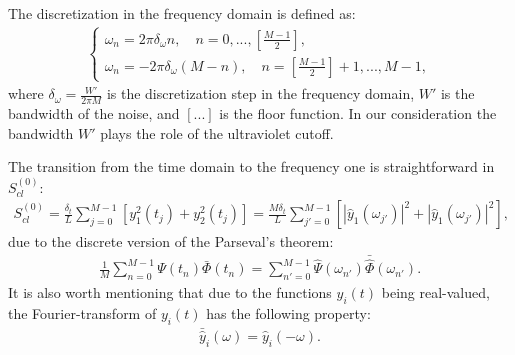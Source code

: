 \documentclass{article}
\begin{document}
The discretization in the frequency domain is defined as: 
\begin{eqnarray}\label{Bfreqs}
    \begin{cases}
    \omega_{n} = 2\pi \delta_{\omega} n,\quad n = 0, ..., \left[\frac{M-1}{2}\right],\\
    \omega_{n} = -2\pi \delta_{\omega} (M - n),\quad n = \left[\frac{M-1}{2}\right] + 1, ..., M-1,
    \end{cases}
\end{eqnarray}
where $\delta_\omega = \frac{W'}{2\pi M}$ is the discretization step in the frequency domain, $W'$ is the bandwidth of the noise, and $[...]$ is the floor function. In our consideration the bandwidth $W'$ plays the role of the ultraviolet cutoff. 

The transition from the time domain to the frequency one is straightforward in $S_{cl}^{(0)}$:
\begin{eqnarray}
    \!\!\!S_{cl}^{(0)} = \frac{\delta_{t}}{L}\sum_{j=0}^{M-1} \left[y_{1}^{2}(t_{j}) + y_{2}^{2}(t_{j})\right] = \frac{M\delta_{t}}{L} \sum_{j'=0}^{M-1} \left[|\hat{y}_{1}(\omega_{j'})|^{2} + |\hat{y}_{1}(\omega_{j'})|^{2}\right],
\end{eqnarray}
due to the discrete version of the Parseval's theorem:
\begin{eqnarray}
    \frac{1}{M} \sum_{n=0}^{M-1} \Psi(t_{n}) \bar{\Phi}(t_{n}) = \sum_{n'=0}^{M-1} \hat{\Psi}(\omega_{n'}) \bar{\hat{\Phi}}(\omega_{n'}).
\end{eqnarray}
It is also worth mentioning that due to the functions $y_{i}(t)$ being real-valued, the Fourier-transform of $y_{i}(t)$ has the following property:
\begin{eqnarray}
    \bar{\hat{y}}_{i}(\omega) = \hat{y}_{i}(-\omega).
\end{eqnarray}
\end{document}

